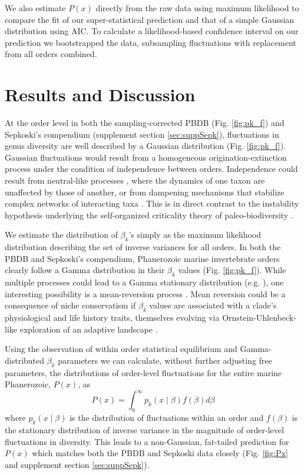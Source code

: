 We also estimate $P(x)$ directly from the raw data using maximum
likelihood to compare the fit of our super-statistical prediction and
that of a simple Gaussian distribution using AIC. To calculate a
likelihood-based confidence interval on our prediction we bootstrapped
the data, subsampling fluctuations with replacement from all orders
combined.

\section{Results and Discussion}
At the order level in both the sampling-corrected PBDB
(Fig. \ref{fig:pk_f}) and Sepkoski's compendium (supplement section
\ref{sec:suppSepk}), fluctuations in genus diversity are well
described by a Gaussian distribution (Fig. \ref{fig:pk_f}). Gaussian
fluctuations would result from a homogeneous origination-extinction
process under the condition of independence between
orders. Independence could result from neutral-like processes
\citep{hubbell2001}, where the dynamics of one taxon are unaffected by
those of another, or from dampening mechanisms that stabilize complex
networks of interacting taxa \citep{brose2005}. This is in direct
contrast to the instability hypothesis underlying the self-organized
criticality theory of paleo-biodiversity \citep{bak1993, sole1997}.

We estimate the distribution of $\beta_k$'s simply as the maximum
likelihood distribution describing the set of inverse variances for
all orders. In both the PBDB and Sepkoski's compendium, Phanerozoic
marine invertebrate orders clearly follow a Gamma distribution in
their $\beta_k$ values (Fig. \ref{fig:pk_f}).  While multiple
processes could lead to a Gamma stationary distribution (e.g.
  \citep{cir1985}), one interesting possibility is a mean-reversion
process \citep{cir1985}. Mean reversion could be a consequence of
niche conservatism if $\beta_k$ values are associated with a clade's
physiological and life history traits, themselves evolving via
Ornstein-Uhlenbeck-like exploration of an adaptive landscape
\citep{cir1985, butler2004}.

Using the observation of within order statistical equilibrium and
Gamma-distributed $\beta_k$ parameters we can calculate, without
further adjusting free parameters, the distributions of order-level
fluctuations for the entire marine Phanerozoic, $P(x)$, as
\begin{equation}
  P(x) = \int_0^\infty p_k(x \mid \beta) f(\beta) d\beta \label{eq:PxInt}
\end{equation}
where $p_k(x \mid \beta)$ is the distribution of fluctuations within
an order and $f(\beta)$ is the stationary distribution of inverse
variance in the magnitude of order-level fluctuations in
diversity. This leads to a non-Gaussian, fat-tailed prediction for
$P(x)$ which matches both the PBDB and Sepkoski data closely
(Fig. \ref{fig:Px} and supplement section \ref{sec:suppSepk}).

